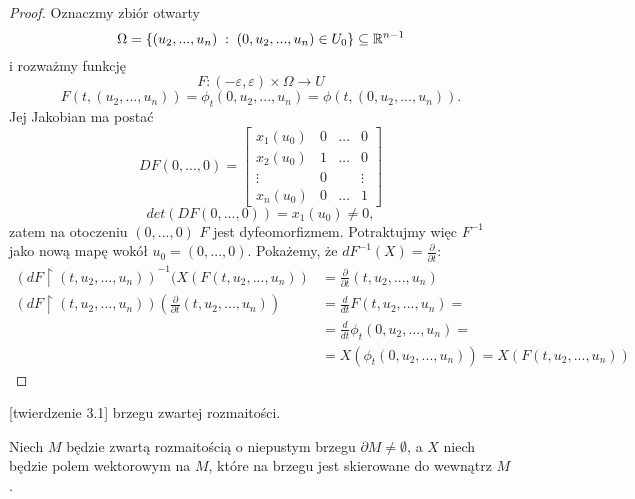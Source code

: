 \begin{example}
\begin{proof}
      Oznaczmy zbiór otwarty
      $$\Omega=\{(u_2,...,u_n)\;:\;(0,u_2,...,u_n)\in U_0\}\subseteq\mathbb{R}^{n-1}$$
      i rozważmy funkcję
      $$F:(-\varepsilon,\varepsilon)\times\Omega\to U$$
      $$F(t, (u_2,...,u_n))=\phi_t(0,u_2,...,u_n)=\phi(t,(0,u_2,...,u_n)).$$
      Jej Jakobian ma postać
      $$DF(0,...,0)=\begin{bmatrix}x_1(u_0) & 0 & \hdots & 0\\
      x_2(u_0) & 1 & \hdots & 0\\
      \vdots & 0 & & \vdots\\
      x_n(u_0) & 0 & \hdots & 1\end{bmatrix}$$
      $$det(DF(0,...,0))=x_1(u_0)\neq 0,$$
      zatem na otoczeniu $(0,...,0)$ $F$ jest dyfeomorfizmem. Potraktujmy więc $F^{-1}$ jako nową mapę wokół $u_0=(0,...,0)$. Pokażemy, że $dF^{-1}(X)=\frac{\partial}{\partial t}$:
      \begin{align*}
        (dF\restriction(t, u_2,...,u_n))^{-1}(X(F(t,u_2,...,u_n))&=\frac{\partial}{\partial t}(t, u_2,...,u_n)\\
        (dF\restriction(t, u_2,...,u_n))(\frac{\partial}{\partial t}(t,u_2,...,u_n))&=\frac{d}{dt}F(t, u_2,...,u_n)=\\
                                                                                    &=\frac{d}{dt}\phi_t(0,u_2,...,u_n)=\\
                                                                                    &=X(\phi_t(0,u_2,...,u_n))=X(F(t,u_2,...,u_n))
      \end{align*}
    \end{proof}
  \item{}\label{dowod otoczenia kolnierzowego}\hyperref[otoczenie kolnierzowe definicja]{} [twierdzenie 3.1]  brzegu zwartej rozmaitości.

    Niech $M$ będzie zwartą rozmaitością o niepustym brzegu $\partial M\neq\emptyset$, a $X$ niech będzie polem wektorowym na $M$, które na brzegu jest skierowane do wewnątrz $M$.
\end{example}
